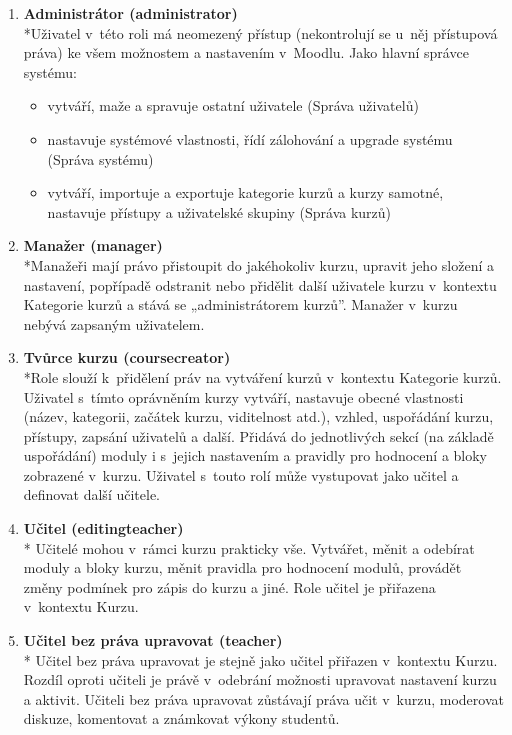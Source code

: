 \documentclass[
print,
  11pt,
  table,   
  nolof,    
  nolot,
  oneside,final
]{fithesis3}
\begin{document}
\begin{enumerate}
\item \textbf{Administrátor (administrator)} \\*Uživatel v~této roli má neomezený přístup (nekontrolují se u~něj přístupová práva) ke všem možnostem a nastavením v~Moodlu. Jako hlavní správce systému: \begin{itemize}
	\item vytváří, maže a spravuje ostatní uživatele (Správa uživatelů)
	\item nastavuje systémové vlastnosti, řídí zálohování a upgrade systému (Správa systému)
	\item vytváří, importuje a exportuje kategorie kurzů a kurzy samotné, nastavuje přístupy a uživatelské skupiny (Správa kurzů)
\end{itemize}
\item \textbf{Manažer (manager)} \\*Manažeři mají právo přistoupit do jakéhokoliv kurzu, upravit jeho složení a nastavení, popřípadě odstranit nebo přidělit další uživatele kurzu v~kontextu Kategorie kurzů a stává se „administrátorem kurzů”. Manažer v~kurzu nebývá zapsaným uživatelem.
 	
\item \textbf{Tvůrce kurzu (coursecreator)} \\*Role slouží k~přidělení práv na vytváření kurzů v~kontextu Kategorie kurzů. Uživatel s~tímto oprávněním kurzy vytváří, nastavuje obecné vlastnosti (název, kategorii, začátek kurzu, viditelnost atd.), vzhled, uspořádání kurzu, přístupy, zapsání uživatelů a další. Přidává do jednotlivých sekcí (na základě uspořádání) moduly i s~jejich nastavením a pravidly pro hodnocení a bloky zobrazené v~kurzu. Uživatel s~touto rolí může vystupovat jako učitel a definovat další učitele.
	
\item \textbf{Učitel (editingteacher)} \\*
	Učitelé mohou v~rámci kurzu prakticky vše. Vytvářet, měnit a odebírat moduly a bloky kurzu, měnit pravidla pro hodnocení modulů, provádět změny podmínek pro zápis do kurzu a jiné. Role učitel je přiřazena v~kontextu Kurzu. 

\item \textbf{Učitel bez práva upravovat (teacher)} \\*
	Učitel bez práva upravovat je stejně jako učitel přiřazen v~kontextu Kurzu. Rozdíl oproti učiteli je právě v~odebrání možnosti upravovat nastavení kurzu a aktivit. Učiteli bez práva upravovat zůstávají práva učit v~kurzu, moderovat diskuze, komentovat a známkovat výkony studentů.


\end{enumerate}
\end{document}
